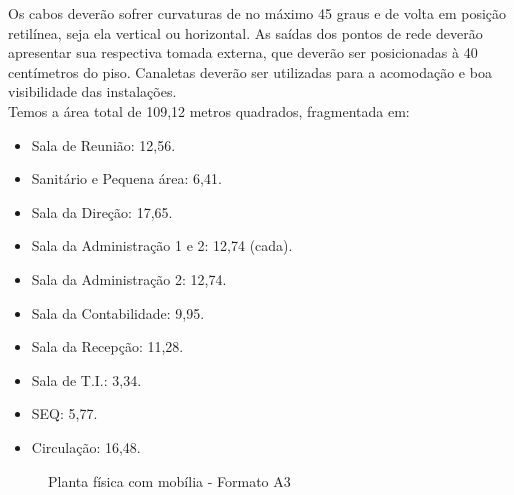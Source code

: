 \documentclass[	DIV=calc,%
							paper=a4,%
							fontsize=12pt,%
							onecolumn]{scrartcl}	 					%
\begin{document}
Os cabos deverão sofrer curvaturas de no máximo 45 graus e de volta em posição retilínea, seja ela vertical ou horizontal. As saídas dos pontos de rede deverão apresentar sua respectiva tomada externa, que deverão ser posicionadas à 40 centímetros do piso. Canaletas deverão ser utilizadas para a acomodação e boa visibilidade das instalações.
\\

Temos a área total de 109,12 metros quadrados, fragmentada em:

\begin{itemize}
	\item Sala de Reunião: 12,56.
	\item Sanitário e Pequena área: 6,41.
	\item Sala da Direção: 17,65.
	\item Sala da Administração 1 e 2: 12,74 (cada).
	\item Sala da Administração 2: 12,74.
	\item Sala da Contabilidade: 9,95.
	\item Sala da Recepção: 11,28.
	\item Sala de T.I.: 3,34.
	\item SEQ: 5,77.
	\item Circulação: 16,48.
	
	
\end{itemize}


\clearpage
{}
\recalctypearea

\begin{figure}
	\noindent{}
	\caption{Planta física com mobília - Formato A3}
	\label{fig1}
\end{figure}
\end{document}
